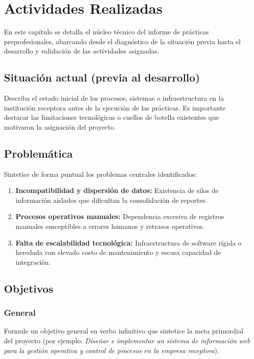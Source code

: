 
\section{Actividades Realizadas}

En este capítulo se detalla el núcleo técnico del informe de prácticas preprofesionales, abarcando desde el diagnóstico de la situación previa hasta el desarrollo y validación de las actividades asignadas.

\subsection{Situación actual (previa al desarrollo)}
Describa el estado inicial de los procesos, sistemas o infraestructura en la institución receptora antes de la ejecución de las prácticas. Es importante destacar las limitaciones tecnológicas o cuellos de botella existentes que motivaron la asignación del proyecto.

\subsection{Problemática}
Sintetice de forma puntual los problemas centrales identificados:
\begin{enumerate}
  \item \textbf{Incompatibilidad y dispersión de datos:} Existencia de silos de información aislados que dificultan la consolidación de reportes.
  \item \textbf{Procesos operativos manuales:} Dependencia excesiva de registros manuales susceptibles a errores humanos y retrasos operativos.
  \item \textbf{Falta de escalabilidad tecnológica:} Infraestructura de software rígida o heredada con elevado costo de mantenimiento y escasa capacidad de integración.
\end{enumerate}

\subsection{Objetivos}

\subsubsection{General}
Formule un objetivo general en verbo infinitivo que sintetice la meta primordial del proyecto (por ejemplo: \textit{Diseñar e implementar un sistema de información web para la gestión operativa y control de procesos en la empresa receptora}).

